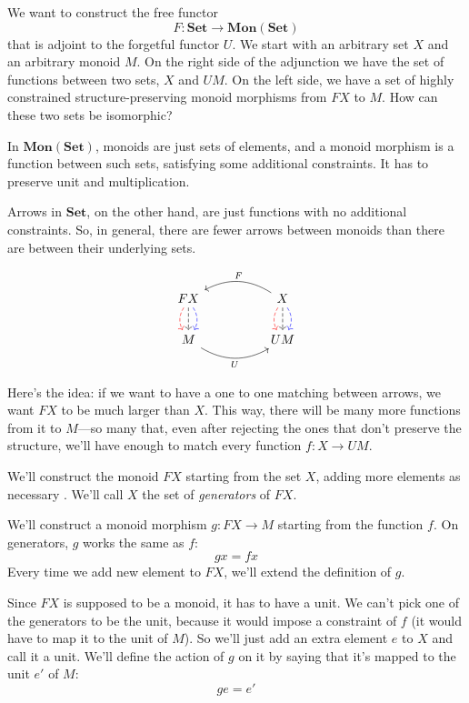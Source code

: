 \documentclass[DaoFP]{subfiles}
\begin{document}
We want to construct the free functor 
\[ F \colon \mathbf{Set} \to \mathbf{Mon}(\mathbf{Set})\]
that is adjoint to the forgetful functor $U$. We start with an arbitrary set $X$ and an arbitrary monoid $M$. On the right side of the adjunction we have the set of functions between two sets, $X$ and $U M$. On the left side, we have a set of highly constrained structure-preserving monoid morphisms from $F X$ to $M$. How can these two sets be isomorphic?

In  $\mathbf{Mon}(\mathbf{Set})$, monoids are just sets of elements, and a monoid morphism is a function between such sets, satisfying some additional constraints. It has to preserve unit and multiplication. 

Arrows in $\mathbf{Set}$, on the other hand, are just functions with no additional constraints. So, in general, there are fewer arrows between monoids than there are between their underlying sets. 

\[
 \begin{tikzcd}
F X
\arrow[d, bend right, red, dashed]
\arrow[d, dashed]
\arrow[d, bend left, blue, dashed]
  &&
  X
\arrow[d, bend right, red, dashed]
\arrow[d, dashed]
\arrow[d, bend left, blue, dashed]
 \arrow[ll, bend right, "F"']
 \\
M
   \arrow[rr, bend right, "U"']
 &&
 U M
  \end{tikzcd}
\]

Here's the idea: if we want to have a one to one matching between arrows, we want $F X$ to be much larger than $X$. This way, there will be many more functions from it to $M$---so many that, even after rejecting the ones that don't preserve the structure, we'll have enough to match every function $f \colon X \to U M$.

We'll construct the monoid $F X$ starting from the set $X$, adding more elements as necessary . We'll call $X$ the set of \emph{generators} of $F X$.

We'll construct a monoid morphism $g \colon F X \to M$ starting from the function $f$. On generators, $g$ works the same as $f$:
\[ g x = f x \]
Every time we add new element to $F X$, we'll extend the definition of $g$.

Since $F X$ is supposed to be a monoid, it has to have a unit. We can't pick one of the generators to be the unit, because it would impose a constraint of $f$ (it would have to map it to the unit of $M$). So we'll just add an extra element $e$ to $X$ and call it a unit. We'll define the action of $g$ on it by saying that it's mapped to the unit $e'$ of $M$:
\[ g e = e' \]
\end{document}
